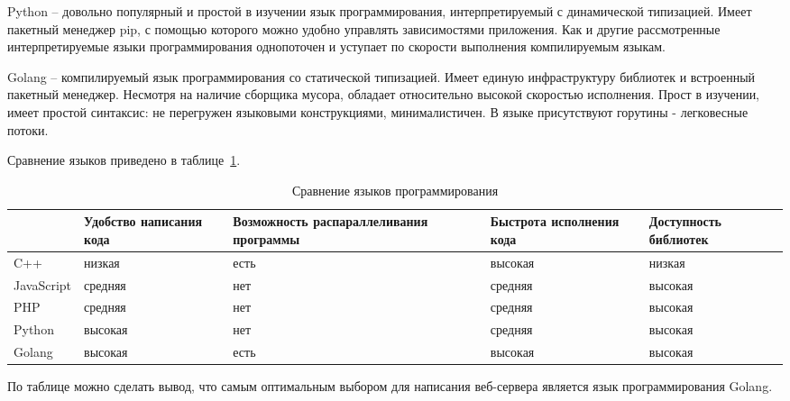 Python – довольно популярный и простой в изучении язык
программирования, интерпретируемый с динамической типизацией. Имеет
пакетный менеджер pip, с помощью которого можно удобно управлять
зависимостями приложения. Как и другие рассмотренные интерпретируемые
языки программирования однопоточен и уступает по скорости выполнения
компилируемым языкам.

Golang – компилируемый язык программирования со статической
типизацией. Имеет единую инфраструктуру библиотек и встроенный
пакетный менеджер. Несмотря на наличие сборщика мусора, обладает
относительно высокой скоростью исполнения. Прост в изучении, имеет
простой синтаксис: не перегружен языковыми конструкциями,
минималистичен. В языке присутствуют горутины - легковесные потоки.

Сравнение языков приведено в таблице~\ref{t:comp-lang}.

\begin{table}[ht]
	\Large
	\caption{Сравнение языков программирования}
	\label{t:comp-lang}
	\centering
	\begin{tabularx}{\textwidth}
		{|>{}X
		|>{\centering\arraybackslash}X
		|>{\centering\arraybackslash}X
		|>{\centering\arraybackslash}X
		|>{\centering\arraybackslash}X|}
		\hline
		                                        &
		Удобство написания кода                 &
		Возможность распараллеливания программы &
		Быстрота исполнения кода                &
		Доступность библиотек                                                        \\
		\hline
		C++
		                                        & низкая  & есть & высокая & низкая  \\
		\hline
		JavaScript
		                                        & средняя & нет  & средняя & высокая \\
		\hline
		PHP
		                                        & средняя & нет  & средняя & высокая \\
		\hline
		Python
		                                        & высокая & нет  & средняя & высокая \\
		\hline
		Golang
		                                        & высокая & есть & высокая & высокая \\
		\hline
	\end{tabularx}
	\vspace{\bottompaddingoftable}
\end{table}


По таблице можно сделать вывод, что самым оптимальным выбором для
написания веб-сервера является язык программирования Golang.


